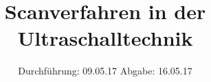 

\subject{US2}
\title{Scanverfahren in der Ultraschalltechnik}
\date{
  Durchführung: 09.05.17
  \hspace{3em}
  Abgabe: 16.05.17
}



\maketitle
\thispagestyle{empty}
\tableofcontents
\newpage






\printbibliography



